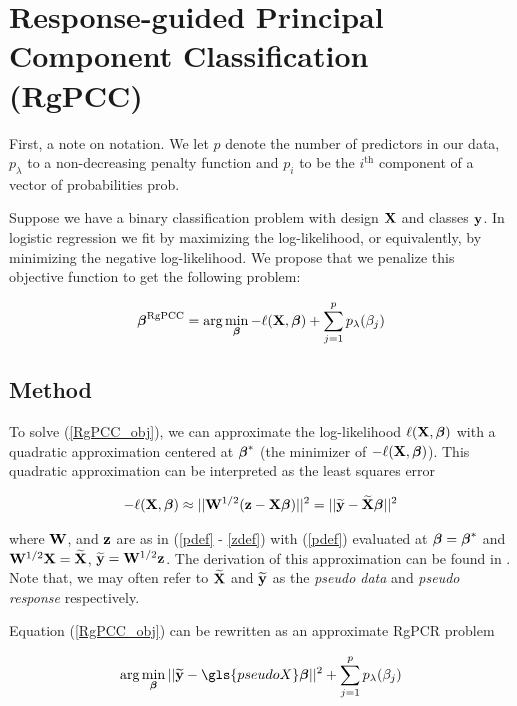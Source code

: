\documentclass[main.tex]{subfiles}
\begin{document}
\section{Response-guided Principal Component Classification (RgPCC)}

First, a note on notation. We let $p$ denote the number of predictors in our data, $p_{\lambda}$ to a non-decreasing penalty function and $p_i$ to be the $i^{\text{th}}$ component of a vector of probabilities \gls{prob}.

Suppose we have a binary classification problem with design $\mathbf{X}$ and classes $\mathbf{y}$. In logistic regression we fit by maximizing the log-likelihood, or equivalently, by minimizing the negative log-likelihood. We propose that we penalize this objective function to get the following problem:

\begin{align}
	\boldsymbol \beta^{\text{RgPCC}} = \text{arg} \min_{\boldsymbol \beta} - \ell(\mathbf{X}, \boldsymbol \beta) + \sum_{j = 1}^p p_{\lambda}(\beta_j) \label{RgPCC_obj}
\end{align}

\subsection{Method}
To solve (\ref{RgPCC_obj}), we can approximate the log-likelihood $\ell(\mathbf{X}, \boldsymbol \beta)$ with a quadratic approximation centered at $\boldsymbol \beta^*$ (the minimizer of $- \ell(\mathbf{X}, \boldsymbol \beta)$). This quadratic approximation can be interpreted as the least squares error

\begin{align}
	- \ell(\mathbf{X}, \boldsymbol \beta) \approx ||\mathbf{W}^{1/2} (\mathbf{z} - \mathbf{X} \boldsymbol \beta)||^2 = || \widetilde{\mathbf{y}} - \widetilde{\mathbf{X}} \boldsymbol \beta ||^2
\end{align}

where $\mathbf{W}$, and $\mathbf{z}$ are as in (\ref{pdef} - \ref{zdef}) with (\ref{pdef}) evaluated at $\boldsymbol \beta = \boldsymbol \beta^*$ and $\mathbf{W}^{1/2} \mathbf{X} = \widetilde{\mathbf{X}}$, $\widetilde{\mathbf{y}} = \mathbf{W}^{1/2} \mathbf{z}$. The derivation of this approximation can be found in \cite{wangleng}. Note that, we may often refer to $\widetilde{\mathbf{X}}$ and $\widetilde{\mathbf{y}}$ as the \emph{pseudo data} and \emph{pseudo response} respectively.

Equation (\ref{RgPCC_obj}) can be rewritten as an approximate RgPCR problem

\begin{align}
	\argmin_{\bbeta} || \widetilde{\y} - \gls{pseudoX} \bbeta ||^2 + \sum_{j = 1}^p p_{\lambda}(\beta_j) \label{RgPCC_obj2}
\end{align}
\end{document}
